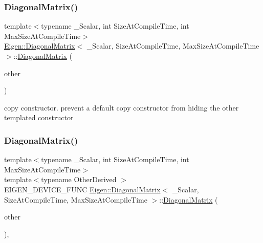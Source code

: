 \subsubsection{\texorpdfstring{DiagonalMatrix()}{DiagonalMatrix()}\hspace{0.1cm}{\footnotesize\ttfamily [6/7]}}
{\footnotesize\ttfamily template$<$typename \+\_\+\+Scalar, int Size\+At\+Compile\+Time, int Max\+Size\+At\+Compile\+Time$>$ \\
\mbox{\hyperlink{class_eigen_1_1_diagonal_matrix}{Eigen\+::\+Diagonal\+Matrix}}$<$ \+\_\+\+Scalar, Size\+At\+Compile\+Time, Max\+Size\+At\+Compile\+Time $>$\+::\mbox{\hyperlink{class_eigen_1_1_diagonal_matrix}{Diagonal\+Matrix}} (\begin{DoxyParamCaption}\item[{const \mbox{\hyperlink{class_eigen_1_1_diagonal_matrix}{Diagonal\+Matrix}}$<$ \+\_\+\+Scalar, Size\+At\+Compile\+Time, Max\+Size\+At\+Compile\+Time $>$ \&}]{other }\end{DoxyParamCaption})\hspace{0.3cm}{\ttfamily [inline]}}

copy constructor. prevent a default copy constructor from hiding the other templated constructor \mbox{\label{class_eigen_1_1_diagonal_matrix_a3a6492f390f0d881f14376e673fd42c3}} 
\subsubsection{\texorpdfstring{DiagonalMatrix()}{DiagonalMatrix()}\hspace{0.1cm}{\footnotesize\ttfamily [7/7]}}
{\footnotesize\ttfamily template$<$typename \+\_\+\+Scalar, int Size\+At\+Compile\+Time, int Max\+Size\+At\+Compile\+Time$>$ \\
template$<$typename Other\+Derived $>$ \\
E\+I\+G\+E\+N\+\_\+\+D\+E\+V\+I\+C\+E\+\_\+\+F\+U\+NC \mbox{\hyperlink{class_eigen_1_1_diagonal_matrix}{Eigen\+::\+Diagonal\+Matrix}}$<$ \+\_\+\+Scalar, Size\+At\+Compile\+Time, Max\+Size\+At\+Compile\+Time $>$\+::\mbox{\hyperlink{class_eigen_1_1_diagonal_matrix}{Diagonal\+Matrix}} (\begin{DoxyParamCaption}\item[{const \mbox{\hyperlink{class_eigen_1_1_matrix_base}{Matrix\+Base}}$<$ Other\+Derived $>$ \&}]{other }\end{DoxyParamCaption})\hspace{0.3cm}{\ttfamily [inline]}, {\ttfamily [explicit]}}

